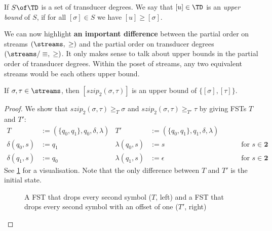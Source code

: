 \begin{definition}
	If $S\of\TD$ is a set of transducer degrees. We say that $[u]\in\TD$ is an \textit{upper bound} of $S$, if for all $[\sigma]\in S$ we have $[u] \geq [\sigma]$.
\end{definition}

We can now highlight \textbf{an important difference} between the partial order on streams $(\streams,\;\geq)$ and the partial order on transducer degrees $(\streams / \equiv,\;\geq)$. It only makes sense to talk about upper bounds in the partial order of transducer degrees. Within the poset of streams, any two equivalent streams would be each others upper bound. 

\begin{lemma}
	If $\sigma,\tau\in\streams$, then $[szip_2(\sigma,\tau)]$ is an upper bound of $\{[\sigma],[\tau]\}$.
	\begin{proof}
		We show that $szip_2(\sigma,\tau) \geq_T \sigma$ and $szip_2(\sigma,\tau) \geq_{T'} \tau$ by giving FSTs $T$ and $T'$:
		\begin{align*}
			T &:= (\{q_0,q_1\},q_0,\delta,\lambda) &T' &:= (\{q_0,q_1\},q_1,\delta,\lambda) \\
			\delta(q_0,s) &:= q_1 &\lambda(q_0,s) &:= s &\qquad \text{ for } s\in\mathbf{2}\\
			\delta(q_1,s) &:= q_0 &\lambda(q_1,s) &:= \epsilon &\qquad \text{ for } s\in\mathbf{2}
		\end{align*}
		See \cref{fig:zip_trans} for a visualisation. Note that the only difference between $T$ and $T'$ is the initial state.
		\begin{figure}[H]
			\centering
			\caption{A FST that drops every second symbol ($T$, left) and a FST that drops every second symbol with an offset of one ($T'$, right)}
			\label{fig:zip_trans}
		\end{figure}
	\end{proof}
\end{lemma}

